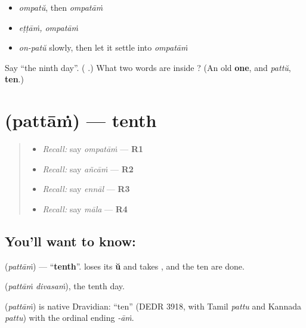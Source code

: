 \begin{itemize}
\raggedright
  \item \emph{ompatŭ}, then \emph{ompatāṁ}
  \item \emph{eṭṭāṁ, ompatāṁ}
  \item \emph{on-patŭ} slowly, then let it settle into \emph{ompatāṁ}
\end{itemize}

\begin{tcolorbox}[breakable,colback=teal!4,colframe=teal!35!black,title={Before you move on}]
Say \textquotedblleft{}the ninth day\textquotedblright{}. (\textbf{ }.) What two words are inside ? (An old \textbf{one}, and \emph{pattŭ}, \textbf{ten}.)
\end{tcolorbox}
\section[\texorpdfstring{\ml{പത്താം} (pattāṁ)}{പത്താം (pattāṁ)}]{ (pattāṁ) — tenth}

\label{lesson:ML-C68-tenth}



\begin{quote}
\begin{itemize}
\raggedright
  \item \emph{Recall:} say \emph{ompatāṁ} — \textbf{R1}
  \item \emph{Recall:} say \emph{añcāṁ} — \textbf{R2}
  \item \emph{Recall:} say \emph{ennāl} — \textbf{R3}
  \item \emph{Recall:} say \emph{māla} — \textbf{R4}
\end{itemize}
\end{quote}

\subsection*{You'll want to know: }
\textbf{} (\emph{pattāṁ}) — \textquotedblleft{}\textbf{tenth}\textquotedblright{}. \textbf{} loses its \textbf{ŭ} and takes \textbf{}, and the ten are done.

\textbf{ } (\emph{pattāṁ divasaṁ}), the tenth day.

\begin{cousinweb}
\textbf{} (\emph{pattāṁ}) is native Dravidian: \textquotedblleft{}ten\textquotedblright{} (DEDR 3918, with Tamil \emph{pattu} and Kannada \emph{pattu}) with the ordinal ending \emph{-āṁ}.
\end{cousinweb}

